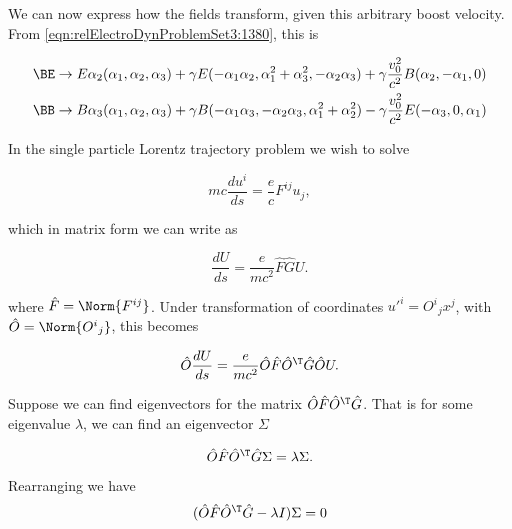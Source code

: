 We can now express how the fields transform, given this arbitrary boost velocity.  From \ref{eqn:relElectroDynProblemSet3:1380}, this is

\begin{align}\label{eqn:relElectroDynProblemSet3:1380b}
\BE &\rightarrow 
E \alpha_2 (\alpha_1, \alpha_2, \alpha_3) 
+ \gamma E (-\alpha_1 \alpha_2, \alpha_1^2 + \alpha_3^2, -\alpha_2 \alpha_3) 
+ \gamma \frac{v_0^2}{c^2} 
B (\alpha_2, -\alpha_1, 0) \\
\BB &\rightarrow
B \alpha_3 (\alpha_1, \alpha_2, \alpha_3)
+ \gamma B (-\alpha_1 \alpha_3, -\alpha_2 \alpha_3, \alpha_1^2 + \alpha_2^2)  
- \gamma \frac{v_0^2}{c^2} E (-\alpha_3, 0, \alpha_1)
\end{align}

In the single particle Lorentz trajectory problem we wish to solve 

\begin{equation}\label{eqn:relElectroDynProblemSet3:1500}
m c \frac{du^i}{ds} = \frac{e}{c} F^{i j} u_j,
\end{equation}

which in matrix form we can write as

\begin{equation}\label{eqn:relElectroDynProblemSet3:1520}
\frac{d U}{ds} = \frac{e}{m c^2} \hat{F} \hat{G} U.
\end{equation}

where $\hat{F} = \Norm{F^{i j}}$.  Under transformation of coordinates ${u'}^i = {O^i}_j x^j$, with $\hat{O} = \Norm{{O^i}_j}$, this becomes

\begin{equation}\label{eqn:relElectroDynProblemSet3:1540}
\hat{O} \frac{d U}{ds} = \frac{e}{m c^2} \hat{O} \hat{F} \hat{O}^\T \hat{G} \hat{O} U.
\end{equation}

Suppose we can find eigenvectors for the matrix $\hat{O} \hat{F} \hat{O}^\T \hat{G}$.  That is for some eigenvalue $\lambda$, we can find an eigenvector $\Sigma$

\begin{equation}\label{eqn:relElectroDynProblemSet3:1560}
\hat{O} \hat{F} \hat{O}^\T \hat{G} \Sigma = \lambda \Sigma.
\end{equation}

Rearranging we have
\begin{equation}\label{eqn:relElectroDynProblemSet3:1580}
(\hat{O} \hat{F} \hat{O}^\T \hat{G} - \lambda I) \Sigma = 0
\end{equation}

